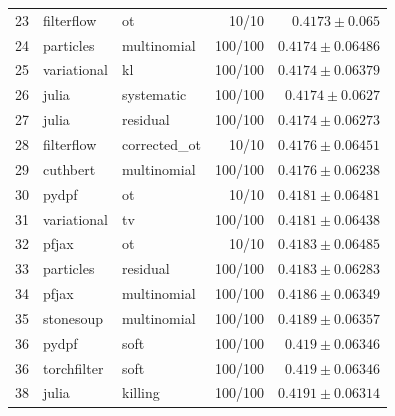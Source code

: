 \begin{table}[!htbp]
\begin{tabular}{rllrr}
23 & filterflow & ot & 10/10 & $0.4173 \pm 0.065$ \\
24 & particles & multinomial & 100/100 & $0.4174 \pm 0.06486$ \\
25 & variational & kl & 100/100 & $0.4174 \pm 0.06379$ \\
26 & julia & systematic & 100/100 & $0.4174 \pm 0.0627$ \\
27 & julia & residual & 100/100 & $0.4174 \pm 0.06273$ \\
28 & filterflow & corrected\_ot & 10/10 & $0.4176 \pm 0.06451$ \\
29 & cuthbert & multinomial & 100/100 & $0.4176 \pm 0.06238$ \\
30 & pydpf & ot & 10/10 & $0.4181 \pm 0.06481$ \\
31 & variational & tv & 100/100 & $0.4181 \pm 0.06438$ \\
32 & pfjax & ot & 10/10 & $0.4183 \pm 0.06485$ \\
33 & particles & residual & 100/100 & $0.4183 \pm 0.06283$ \\
34 & pfjax & multinomial & 100/100 & $0.4186 \pm 0.06349$ \\
35 & stonesoup & multinomial & 100/100 & $0.4189 \pm 0.06357$ \\
36 & pydpf & soft & 100/100 & $0.419 \pm 0.06346$ \\
36 & torchfilter & soft & 100/100 & $0.419 \pm 0.06346$ \\
38 & julia & killing & 100/100 & $0.4191 \pm 0.06314$ \\
\bottomrule
\end{tabular}
\end{table}

